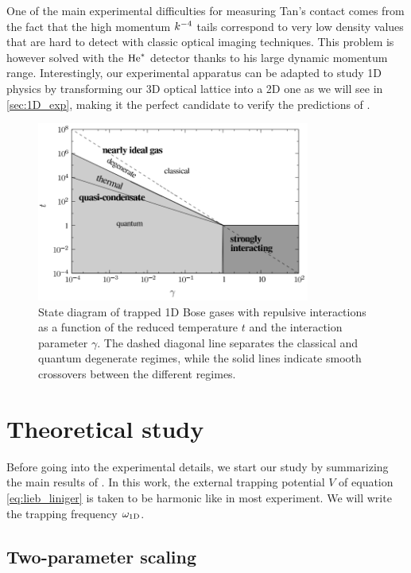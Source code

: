 One of the main experimental difficulties for measuring Tan's contact comes from the fact that the high momentum $k^{-4}$ tails correspond to very low density values that are hard to detect with classic optical imaging techniques. This problem is however solved with the $\mathrm{He}^*$ detector thanks to his large dynamic momentum range. Interestingly, our experimental apparatus can be adapted to study 1D physics by transforming our 3D optical lattice into a 2D one as we will see in \ref{sec:1D_exp}, making it the perfect candidate to verify the predictions of \cite{yao2018tan}.

\begin{figure}
    \centering
    \includegraphics[width=0.8\textwidth]{Fig/Chapter5/quant_degeneracy_1D_trapped.PNG}
    \caption{State diagram of trapped 1D Bose gases with repulsive interactions as a function of the reduced temperature $t$ and the interaction parameter $\gamma$. The dashed diagonal line separates the classical and quantum degenerate regimes, while the solid lines indicate smooth crossovers between the different regimes.}
    \label{fig:1D_diagram}
\end{figure}


\section{Theoretical study}

\label{sec:1D_theory}

Before going into the experimental details, we start our study by summarizing the main results of \cite{yao2018tan}. In this work, the external trapping potential $V$ of equation \ref{eq:lieb_liniger} is taken to be harmonic like in most experiment. We will write the trapping frequency $\omega_{\rm{1D}}$. 

\subsection{Two-parameter scaling}

